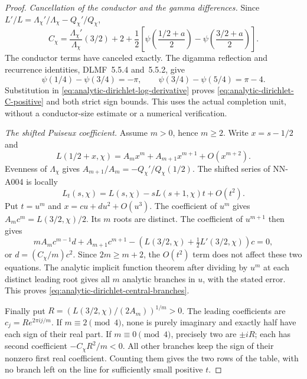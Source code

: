 \begin{proof}
\emph{Cancellation of the conductor and the gamma differences.}
Since $L'/L=\Lambda_\chi'/\Lambda_\chi-Q_\chi'/Q_\chi$,
\[
 C_\chi=\frac{\Lambda_\chi'}{\Lambda_\chi}(3/2)
          +2+\frac12\left[
              \psi\left(\frac{1/2+a}{2}\right)
             -\psi\left(\frac{3/2+a}{2}\right)\right].
\]
The conductor terms have canceled exactly. The digamma
reflection and recurrence identities, DLMF~5.5.4 and~5.5.2,
give
\[
 \psi(1/4)-\psi(3/4)=-\pi,\qquad
 \psi(3/4)-\psi(5/4)=\pi-4.
\]
Substitution in \eqref{eq:analytic-dirichlet-log-derivative}
proves \eqref{eq:analytic-dirichlet-C-positive} and both strict
sign bounds. This uses the actual completion unit, without a
conductor-size estimate or a numerical verification.

\emph{The shifted Puiseux coefficient.}
Assume $m>0$, hence $m\ge2$. Write $x=s-1/2$ and
\[
 L(1/2+x,\chi)=A_mx^m+A_{m+1}x^{m+1}+O(x^{m+2}).
\]
Evenness of $\Lambda_\chi$ gives
$A_{m+1}/A_m=-Q_\chi'/Q_\chi(1/2)$. The shifted series of
NN-A004 is locally
\[
 L_t(s,\chi)=L(s,\chi)-sL(s+1,\chi)t+O(t^2).
\]
Put $t=u^m$ and $x=cu+du^2+O(u^3)$. The coefficient of $u^m$
gives $A_mc^m=L(3/2,\chi)/2$. Its $m$ roots are distinct.
The coefficient of $u^{m+1}$ then gives
\[
 mA_mc^{m-1}d+A_{m+1}c^{m+1}
       -\left(L(3/2,\chi)+\tfrac12L'(3/2,\chi)\right)c=0,
\]
or $d=(C_\chi/m)c^2$. Since $2m\ge m+2$, the $O(t^2)$ term
does not affect these two equations. The analytic implicit
function theorem after dividing by $u^m$ at each distinct
leading root gives all $m$ analytic branches in $u$, with the
stated error. This proves
\eqref{eq:analytic-dirichlet-central-branches}.

Finally put $R=(L(3/2,\chi)/(2A_m))^{1/m}>0$. The leading
coefficients are $c_j=Re^{2\pi ij/m}$. If $m\equiv2\pmod4$,
none is purely imaginary and exactly half have each sign of
their real part. If $m\equiv0\pmod4$, precisely two are
$\pm iR$; each has second coefficient
$-C_\chi R^2/m<0$. All other branches keep the sign of their
nonzero first real coefficient. Counting them gives the two
rows of the table, with no branch left on the line for
sufficiently small positive $t$.
\end{proof}

